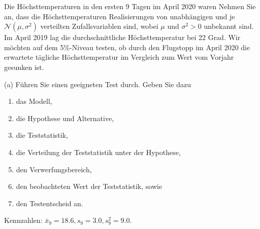 Die Höchsttemperaturen in den ersten 9 Tagen im April 2020 waren
Nehmen Sie an, dass die Höchsttemperaturen Realisierungen von unabhängigen und je $\mathcal{N}\left(\mu, \sigma^{2}\right)$ verteilten Zufallsvariablen sind, wobei $\mu$ und $\sigma^{2}>0$ unbekannt sind. Im April 2019 lag die durchschnittliche Höchsttemperatur bei 22 Grad. Wir möchten auf dem 5\%-Niveau testen, ob durch den Flugstopp im April 2020 die erwartete tägliche Höchsttemperatur im Vergleich zum Wert vom Vorjahr gesunken ist.

(a) Führen Sie einen geeigneten Test durch. Geben Sie dazu
\begin{enumerate}[label=\roman*]
	\item das Modell,
	\item die Hypothese und Alternative,
	\item die Teststatistik,
	\item die Verteilung der Teststatistik unter der Hypothese,
	\item den Verwerfungsbereich,
	\item den beobachteten Wert der Teststatistik, sowie
	\item den Testentscheid an.
\end{enumerate}
Kennzahlen: $\bar{x}_{9}=18.6, s_{9}=3.0, s_{9}^{2}=9.0$.

